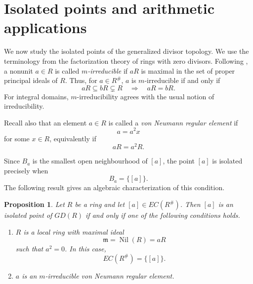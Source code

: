\documentclass[11pt]{amsart}
\theoremstyle{plain}
\newtheorem{proposition}[theorem]{Proposition}
\theoremstyle{definition}
\theoremstyle{remark}
\numberwithin{equation}{section}
\begin{document}
\section{Isolated points and arithmetic applications}

We now study the isolated points of the generalized divisor topology.
We use the terminology from the factorization theory of rings with zero
divisors. Following \cite{AndersonValdesLeon,AndersonChunII}, a nonunit
$a\in R$ is called \emph{$m$-irreducible} if $aR$ is maximal in the set
of proper principal ideals of $R$. Thus, for $a\in R^\#$,
$a$ is $m$-irreducible if and only if
\[
aR\subseteq bR\subsetneq R
\quad\Longrightarrow\quad
aR=bR.
\]
For integral domains, $m$-irreducibility agrees with the usual notion of
irreducibility.

Recall also that an element $a\in R$ is called a
\emph{von Neumann regular element} if
\[
a=a^2x
\]
for some $x\in R$, equivalently if
\[
aR=a^2R.
\]

Since $B_a$ is the smallest open neighbourhood of $[a]$, the point
$[a]$ is isolated precisely when
\[
B_a=\{[a]\}.
\]
The following result gives an algebraic characterization of this
condition.

\begin{proposition}\label{prop:isolated}
	Let $R$ be a ring and let $[a]\in EC(R^\#)$. Then $[a]$ is an isolated
	point of $GD(R)$ if and only if one of the following conditions holds.
	\begin{enumerate}
		\item $R$ is a local ring with maximal ideal
		\[
		\mathfrak m=\operatorname{Nil}(R)=aR
		\]
		such that $a^2=0$. In this case,
		\[
		EC(R^\#)=\{[a]\}.
		\]
		
		\item $a$ is an $m$-irreducible von Neumann regular element.
	\end{enumerate}
\end{proposition}
\end{document}

